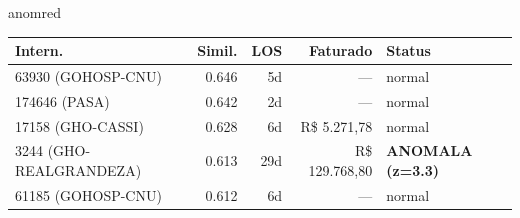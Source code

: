 \documentclass[a4paper,10pt]{article}
\begin{document}
\begin{anomalycard}[Internacao 150288 | GHO-PETROBRAS | CRITICO (z=6.45)]{anomred}
\begin{tabular}{l r r r l}\toprule\textbf{Intern.} & \textbf{Simil.} & \textbf{LOS} & \textbf{Faturado} & \textbf{Status} \\\midrule
63930 (GOHOSP-CNU) & 0.646 & 5d & --- & \textcolor{jcubeblue}{normal} \\
174646 (PASA) & 0.642 & 2d & --- & \textcolor{jcubeblue}{normal} \\
17158 (GHO-CASSI) & 0.628 & 6d & R\$ 5.271,78 & \textcolor{jcubeblue}{normal} \\
3244 (GHO-REALGRANDEZA) & 0.613 & 29d & R\$ 129.768,80 & \textcolor{anomred}{\textbf{ANOMALA (z=3.3)}} \\
61185 (GOHOSP-CNU) & 0.612 & 6d & --- & \textcolor{jcubeblue}{normal} \\
\bottomrule\end{tabular}


\end{anomalycard}

\newpage
\end{document}
